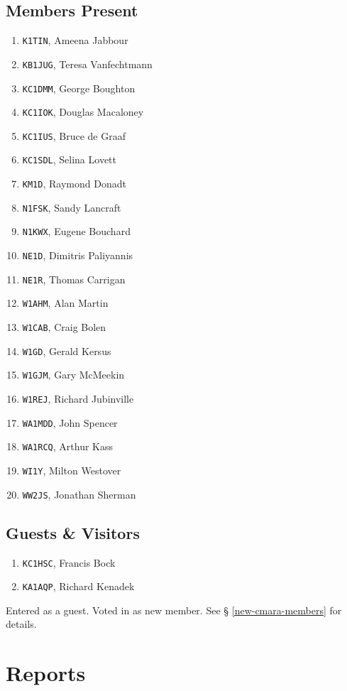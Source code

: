 \documentclass[10pt,letterpaper]{article}
\begin{document}
\subsection{Members Present}
\begin{enumerate}
\item \texttt{K1TIN}, Ameena Jabbour
\item \texttt{KB1JUG}, Teresa Vanfechtmann
\item \texttt{KC1DMM}, George Boughton
\item \texttt{KC1IOK}, Douglas Macaloney
\item \texttt{KC1IUS},  Bruce de Graaf
\item \texttt{KC1SDL}, Selina Lovett
\item \texttt{KM1D}, Raymond Donadt
\item \texttt{N1FSK}, Sandy Lancraft
\item \texttt{N1KWX}, Eugene Bouchard
\item \texttt{NE1D}, Dimitris Paliyannis
\item \texttt{NE1R}, Thomas Carrigan
\item \texttt{W1AHM}, Alan Martin
\item \texttt{W1CAB}, Craig Bolen
\item \texttt{W1GD}, Gerald Kersus
\item \texttt{W1GJM}, Gary McMeekin
\item \texttt{W1REJ}, Richard Jubinville
\item \texttt{WA1MDD}, John Spencer
\item \texttt{WA1RCQ}, Arthur Kass
\item \texttt{WI1Y}, Milton Westover
\item \texttt{WW2JS}, Jonathan Sherman
\end{enumerate}

\subsection{Guests \& Visitors}
\begin{enumerate}
  \item \texttt{KC1HSC}, Francis Bock\textasteriskcentered{}
  \item \texttt{KA1AQP}, Richard Kenadek
\end{enumerate}

\noindent
\textasteriskcentered{} Entered as a guest. Voted in as new member. See \S{} \ref{new-cmara-members} for details.

\section{Reports}
\end{document}
